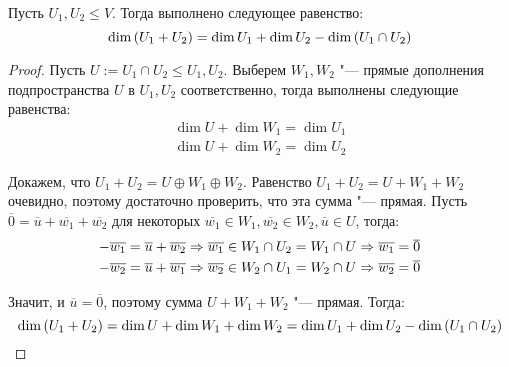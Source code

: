     \begin{theorem}
    	Пусть $U_1, U_2 \le V$. Тогда выполнено следующее равенство:
    	\[\dim{(U_1 + U_2)} = \dim{U_1} \hm{+} \dim{U_2} - \dim{(U_1 \cap U_2)}\]
    \end{theorem}
    
    \begin{proof}
    	Пусть $U := U_1 \cap U_2 \le U_1, U_2$. Выберем $W_1, W_2$ "--- прямые дополнения подпространства $U$ в $U_1, U_2$ соответственно, тогда выполнены следующие равенства:
    	\begin{gather*}
    		\dim{U} + \dim{W_1} = \dim{U_1}
    		\\
    		\dim{U} + \dim{W_2} = \dim{U_2}
    	\end{gather*}
    	
    	Докажем, что $U_1 + U_2 = U \oplus W_1 \oplus W_2$. Равенство $U_1 + U_2 = U + W_1 + W_2$ очевидно, поэтому достаточно проверить, что эта сумма "--- прямая. Пусть $\overline{0} = \overline{u} + \overline{w_1} + \overline{w_2}$ для некоторых $\overline{w_1} \in W_1, \overline{w_2} \in W_2, \overline{u} \in U$, тогда:
    	\begin{gather*}
    		-\overline{w_1} = \overline{u} + \overline{w_2} \Rightarrow \overline{w_1} \in W_1 \cap U_2 = W_1 \cap U \Rightarrow \overline{w_1} = \overline{0}
    		\\
    		-\overline{w_2} = \overline{u} + \overline{w_1} \Rightarrow \overline{w_2} \in W_2 \cap U_1 = W_2 \cap U \Rightarrow \overline{w_2} = \overline{0}
    	\end{gather*}
    
    	Значит, и $\overline{u} = \overline{0}$, поэтому сумма $U + W_1 + W_2$ "--- прямая. Тогда:
    	\[\dim{(U_1 + U_2)} = \dim{U} + \dim{W_1} + \dim{W_2} = \dim{U_1} \hm{+} \dim{U_2} - \dim{(U_1 \cap U_2)}\qedhere\]
    \end{proof}